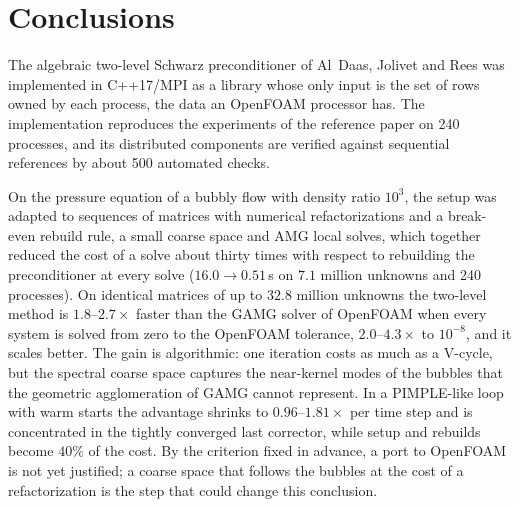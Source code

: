 \documentclass[11pt,a4paper]{article}
\begin{document}
\section{Conclusions}\label{sec:conclusions}

The algebraic two-level Schwarz preconditioner of Al~Daas, Jolivet and Rees was implemented in C++17/MPI as a
library whose only input is the set of rows owned by each process, the data an OpenFOAM processor has. The
implementation reproduces the experiments of the reference paper on 240 processes, and its distributed
components are verified against sequential references by about 500 automated checks.

On the pressure equation of a bubbly flow with density ratio $10^3$, the setup was adapted to sequences of
matrices with numerical refactorizations and a break-even rebuild rule, a small coarse space and AMG local
solves, which together reduced the cost of a solve about thirty times with respect to rebuilding the
preconditioner at every solve ($16.0\to0.51$\,s on $7.1$ million unknowns and 240 processes). On identical matrices of up to $32.8$ million unknowns the two-level method
is $1.8$--$2.7\times$ faster than the GAMG solver of OpenFOAM when every system is solved from zero to the
OpenFOAM tolerance, $2.0$--$4.3\times$ to $10^{-8}$, and it scales better. The gain is algorithmic: one iteration
costs as much as a V-cycle, but the spectral coarse space captures the near-kernel modes of the bubbles that
the geometric agglomeration of GAMG cannot represent. In a PIMPLE-like loop with warm starts the advantage
shrinks to $0.96$--$1.81\times$ per time step and is concentrated in the tightly converged last corrector, while
setup and rebuilds become $40\%$ of the cost. By the criterion fixed in advance, a port to OpenFOAM is not yet
justified; a coarse space that follows the bubbles at the cost of a refactorization is the step that could
change this conclusion.



\end{document}
